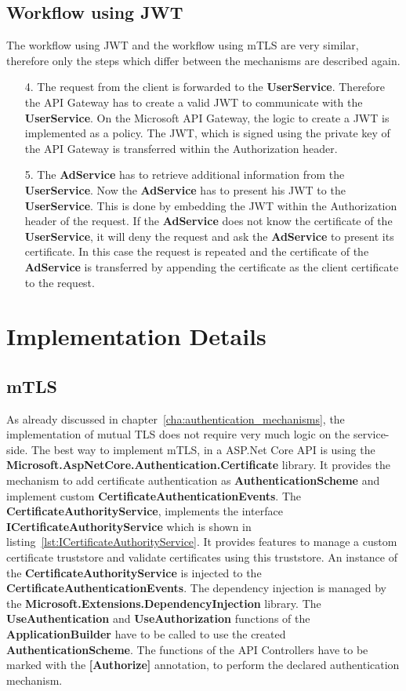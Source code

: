 \subsection{Workflow using JWT}
The workflow using JWT and the workflow using mTLS are very similar, therefore only the steps which differ between the mechanisms are described again.
\begin{enumerate}
	\item[4.] The request from the client is forwarded to the \textbf{UserService}. 
		Therefore the API Gateway has to create a valid JWT to communicate with the \textbf{UserService}.
		On the Microsoft API Gateway, the logic to create a JWT is implemented as a policy.
		The JWT, which is signed using the private key of the API Gateway is transferred within the Authorization header.
	\item[5.] The \textbf{AdService} has to retrieve additional information from the \textbf{UserService}.
		Now the \textbf{AdService} has to present his JWT to the \textbf{UserService}.
		This is done by embedding the JWT within the Authorization header of the request.
		If the \textbf{AdService} does not know the certificate of the \textbf{UserService}, it will deny the request and ask the \textbf{AdService} to present its certificate.
		In this case the request is repeated and the certificate of the \textbf{AdService} is transferred by appending the certificate as the client certificate to the request.
\end{enumerate}

\section{Implementation Details}

\subsection{mTLS} \label{sec:impl_details_mtls}
As already discussed in chapter~\ref{cha:authentication_mechanisms}, the implementation of mutual TLS does not require very much logic on the service-side.
The best way to implement mTLS, in a ASP.Net Core API is using the \textbf{Microsoft.AspNetCore.Authentication.Certificate} library.
It provides the mechanism to add certificate authentication as \textbf{AuthenticationScheme} and implement custom \textbf{CertificateAuthenticationEvents}.
The \textbf{CertificateAuthorityService}, implements the interface \textbf{ICertificateAuthorityService} which is shown in listing~\ref{lst:ICertificateAuthorityService}.
It provides features to manage a custom certificate truststore and validate certificates using this truststore.
An instance of the \textbf{CertificateAuthorityService} is injected to the \textbf{CertificateAuthenticationEvents}.
The dependency injection is managed by the \textbf{Microsoft.Extensions.DependencyInjection} library.
The \textbf{UseAuthentication} and \textbf{UseAuthorization} functions of the \textbf{ApplicationBuilder} have to be called to use the created \textbf{AuthenticationScheme}.
The functions of the API Controllers have to be marked with the \textbf{[Authorize]} annotation, to perform the declared authentication mechanism.

